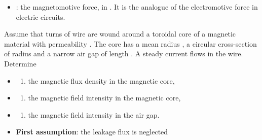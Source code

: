 \begin{ELjoin}

\begin{itemize}
\tightlist
\item
  : the magnetomotive force, in . It is the analogue of the electromotive force in electric circuits.
\end{itemize}


\begin{ELexample}{}

Assume that  turns of wire are wound around a toroidal core of a magnetic material with permeability \ELim{\mu}. The core has a mean radius , a circular cross-section of radius  and a narrow air gap of length . A steady current  flows in the wire. Determine

\begin{itemize}
\item
  \begin{enumerate}
  \def\labelenumi{(\alph{enumi})}
  \tightlist
  \item
    the magnetic flux density in the magnetic core,
  \end{enumerate}
\item
  \begin{enumerate}
  \def\labelenumi{(\alph{enumi})}
  \setcounter{enumi}{1}
  \tightlist
  \item
    the magnetic field intensity in the magnetic core,
  \end{enumerate}
\item
  \begin{enumerate}
  \def\labelenumi{(\alph{enumi})}
  \setcounter{enumi}{2}
  \tightlist
  \item
    the magnetic field intensity in the air gap.
  \end{enumerate}
\end{itemize}


\begin{ELsolution}

\begin{itemize}
\tightlist
\item
  \textbf{First assumption}: the leakage flux is neglected
\end{itemize}




\end{ELsolution}
\end{ELexample}
\end{ELjoin}

